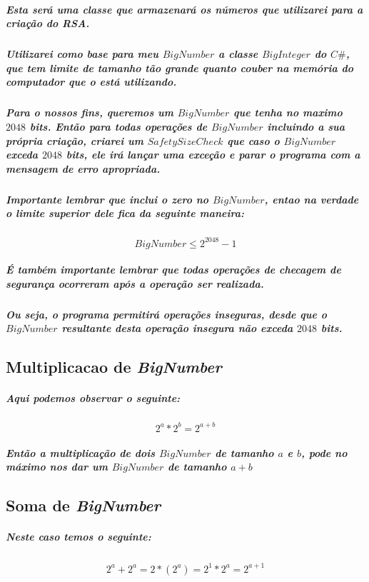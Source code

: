 \documentclass[12pt,twoside, a4paper, twocolumn]{article}
\begin{document}
\subparagraph{Esta será uma classe que armazenará os números que utilizarei para a criação do RSA. }
\subparagraph*{Utilizarei como base para meu $BigNumber$ a classe $BigInteger$ do $C\#$, que tem limite de tamanho tão grande quanto couber na memória do computador que o está utilizando.}
\subparagraph*{Para o nossos fins, queremos um $BigNumber$ que tenha no maximo $2048$ bits. Então para todas operações de $BigNumber$ incluindo a sua própria criação, criarei um $SafetySizeCheck$ que caso o $BigNumber$ exceda $2048$ bits, ele irá lançar uma exceção e parar o programa com a mensagem de erro apropriada.}
\subparagraph*{Importante lembrar que inclui o zero no $BigNumber$, entao na verdade o limite superior dele fica da seguinte maneira:}

\begin{equation}
    BigNumber \le 2^{2048} - 1
\end{equation}

\subparagraph*{É também importante lembrar que todas operações de checagem de segurança ocorreram \emph{após} a operação ser realizada.}

\subparagraph*{Ou seja, o programa permitirá operações inseguras, desde que o $BigNumber$ resultante desta operação insegura não exceda $2048$ bits.}

\subsection{Multiplicacao de \emph{BigNumber}}

\subparagraph*{Aqui podemos observar o seguinte:}

\begin{equation}
    2^a * 2^b = 2^{a + b}
\end{equation}

\subparagraph*{Então a multiplicação de dois $BigNumber$ de tamanho $a$ e $b$, pode no máximo nos dar um $BigNumber$ de tamanho $a+b$}

\subsection{Soma de \emph{BigNumber}}

\subparagraph*{Neste caso temos o seguinte:}

\begin{equation}
    \begin{aligned}
        2^a + 2^a = 2*(2^a) = 2^1 * 2^a = 2^{a + 1}
    \end{aligned}
\end{equation}
\end{document}
